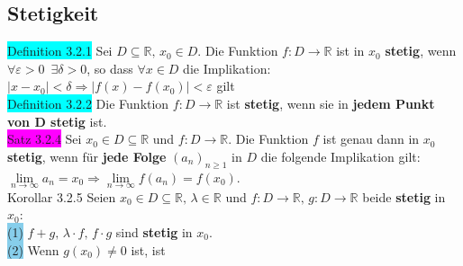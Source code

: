 \documentclass[landscape, 10pt]{article}
\newcommand{\R}{\mathbb{R}}
\begin{document}
\begin{multicols}{3}
       \subsection{Stetigkeit}
              \colorbox{cyan}{Definition 3.2.1} 
                     Sei $D\subseteq\R,\,x_0\in D$. 
                     Die Funktion \textcolor{NavyBlue}{$f:D\longrightarrow\R$} 
                     ist in $x_0$ \textbf{stetig}, 
                     wenn \textcolor{NavyBlue}{
                     $\forall\varepsilon>0\enspace\exists\delta>0$}, 
                     so dass 
                     \textcolor{NavyBlue}{$\forall x\in D$} die Implikation: 
                     \textcolor{NavyBlue}{
                     $|x-x_0|<\delta\Rightarrow|f(x)-f(x_0)|<\varepsilon$} gilt\\
              \colorbox{cyan}{Definition 3.2.2} 
                     Die Funktion \textcolor{NavyBlue}{$f:D\longrightarrow\R$}
                     ist \textbf{stetig}, wenn sie in 
                     \textbf{jedem Punkt von D stetig} ist.\\
              \colorbox{magenta}{Satz 3.2.4} Sei 
                     \textcolor{NavyBlue}{$x_0\in D\subseteq\R$} und 
                     \textcolor{NavyBlue}{$f:D\longrightarrow\R$}. 
                     Die Funktion \textcolor{NavyBlue}{$f$} ist genau 
                     dann in \textcolor{NavyBlue}{$x_0$} \textbf{stetig}, wenn für 
                     \textbf{jede Folge} 
                     \textcolor{NavyBlue}{$(a_n)_{n\geqslant1}$} 
                     in $D$ die folgende Implikation gilt: \textcolor{NavyBlue}{
                     $\lim\limits_{n\to\infty}a_n=x_0\Longrightarrow
                     \lim\limits_{n\to\infty}f(a_n)=f(x_0)$}.\\
              \colorbox{BurntOrange}{Korollar 3.2.5} Seien 
                     \textcolor{NavyBlue}{
                     $x_0\in D\subseteq\R,\,\lambda\in\R$} und 
                     \textcolor{NavyBlue}{
                     $f:D\longrightarrow\R,\,g:D\longrightarrow\R$}
                     beide \textbf{stetig} in \textcolor{NavyBlue}{$x_0$}:\\
                     \colorbox{SkyBlue}{(1)}
                            \textcolor{NavyBlue}{
                            $f+g,\,\lambda\cdot f,\,f\cdot g$} 
                            sind \textbf{stetig} in 
                            \textcolor{NavyBlue}{$x_0$}.\\
                     \colorbox{SkyBlue}{(2)}
                            Wenn $g(x_0)\neq0$ ist, ist 

\end{multicols}
\end{document}
